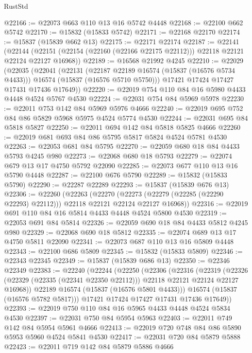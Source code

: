 \begin{lexlean}{RustStd}
\begin{coremodule}
{\begin{coremodule}
{{{{{{{{{{{{{{{{{{{{{{{{{{{{{{{{{{{{{{{{{{{{{{{{{{{{{{{{{{{{@22166 := @22073 @663 @110 @13 @16 @5742 @4448
@22168 := @22100 @662 @5742
@22170 := @15832 (@15833 @5742)
@22171 := @22168 @22170
@22174 := @15837 (@15839 @662 @13)
@22175 := @22171 @22174
@22187 := @22141
    (@22144 (@22151 (@22154 (@22160 (@22166 @22175 @22112))) @22118 @22121 @22124 @22127 @16968))
@22189 := @16568 @21992 @4245
@22210 := @22029
    (@22035
      (@22041
        (@22131
          (@22187 @22189 @16574 (@15837 (@16576 @5734 @4433)))
          @16574
          (@15837 (@16576 @5710 @5750)))
        @17421
        @17424
        @17427
        @17431
        @17436
        @17649))
@22220 := @22019 @754 @110 @84 @16 @5980 @4433 @4448 @4524 @5767 @4530
@22224 := @22031 @754 @84 @5969 @5978
@22230 := @22011 @753 @142 @84 @5969 @5976 @4666
@22240 := @22019 @695 @752 @84 @86 @5829 @5968 @5975 @4524 @5774 @4530
@22244 := @22031 @695 @84 @5818 @5827
@22250 := @22011 @694 @142 @84 @5818 @5825 @4666
@22260 := @22019 @681 @693 @84 @86 @5795 @5817 @5824 @4524 @5781 @4530
@22263 := @22053 @681 @84 @5795
@22270 := @22059 @680 @18 @84 @4433 @5793 @4245 @980
@22273 := @22068 @680 @18 @5793
@22279 := @22074 @679 @13 @17 @4750 @5792 @22090
@22285 := @22073 @677 @110 @13 @16 @5790 @4448
@22287 := @22100 @676 @5790
@22289 := @15832 (@15833 @5790)
@22290 := @22287 @22289
@22293 := @15837 (@15839 @676 @13)
@22306 := @22260
    (@22263
      (@22270 (@22273 (@22279 (@22285 (@22290 @22293) @22112))) @22118 @22121 @22124 @22127 @16968))
@22316 := @22019 @691 @110 @84 @16 @5814 @4433 @4448 @4524 @5800 @4530
@22319 := @22053 @691 @84 @5814
@22326 := @22059 @690 @18 @84 @4433 @5812 @4245 @980
@22329 := @22068 @690 @18 @5812
@22335 := @22074 @689 @13 @17 @4750 @5811 @22090
@22341 := @22073 @687 @110 @13 @16 @5809 @4448
@22343 := @22100 @686 @5809
@22345 := @15832 (@15833 @5809)
@22346 := @22343 @22345
@22349 := @15837 (@15839 @686 @13)
@22350 := @22346 @22349
@22383 := @22240
    (@22244
      (@22250
        (@22306
          (@22316
            (@22319
              (@22326 (@22329 (@22335 (@22341 @22350 @22112))) @22118 @22121 @22124 @22127 @16968))
            @22189
            @16574
            (@15837 (@16576 @5801 @4433)))
          @16574
          (@15837 (@16576 @5782 @5817)))
        @17421
        @17424
        @17427
        @17431
        @17436
        @17649))
@22393 := @22019 @750 @110 @84 @16 @5965 @4433 @4448 @4524 @5834 @4530
@22397 := @22031 @750 @84 @5954 @5963
@22403 := @22011 @749 @142 @84 @5954 @5961 @4666
@22413 := @22019 @720 @748 @84 @86 @5890 @5953 @5960 @4524 @5841 @4530
@22417 := @22031 @720 @84 @5879 @5888
@22423 := @22011 @719 @142 @84 @5879 @5886 @4666
}}}}}}}}}}}}}}}}}}}}}}}}}}}}}}}}}}}}}}}}}}}}}}}}}}}}}}}}}}}}
\end{coremodule}}
\end{coremodule}
\end{lexlean}
